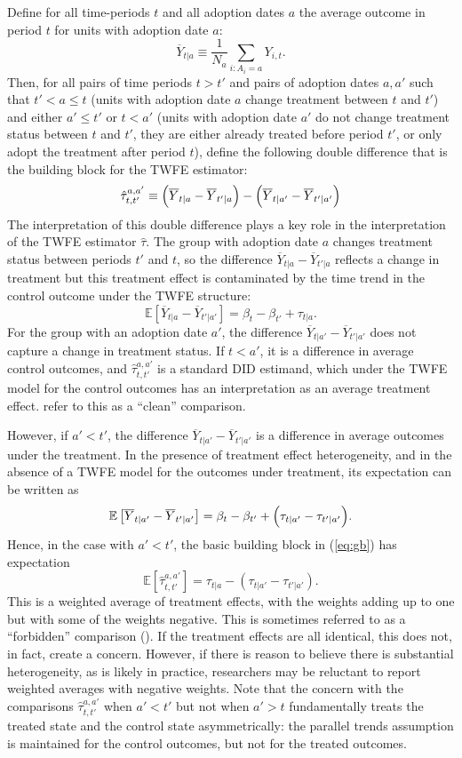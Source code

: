 \documentclass[letterpaper,12pt,leqno]{article}
\newcommand{\oy}{\overline{Y}}
\newcommand{\mme}{{\mathbb{E}}}
\begin{document}
Define for all time-periods $t$ and all adoption dates $a$ the average outcome in period $t$ for units with adoption date $a$:
\[ \oy_{t|a}\equiv \frac{1}{N_a}\sum_{i:A_i=a} Y_{i,t}.\]
Then, for all pairs of time periods $t>t'$ and pairs of adoption dates $a,a'$ such that $t'<a\leq t$ (units with adoption date $a$ change treatment between $t$ and $t'$) and either $a'\leq t'$ or $t<a'$ (units with adoption date $a'$ do not change treatment status between $t$ and $t'$, they are either already treated before period $t'$, or only adopt the treatment after period $t$), define the following double difference that is the building block for the  TWFE estimator:
\begin{equation}\label{eq:gb} \hat\tau_{t,t'}^{a,a'}\equiv \Bigl(\overline{Y}_{t|a}-\overline{Y}_{t^{\prime}|a}\Bigr)
-\Bigl(\overline{Y}_{t|a'}-\overline{Y}_{t'|a'}\Bigr)\end{equation}
The interpretation of this double difference plays a key role in the interpretation of the TWFE estimator $\hat\tau$. The group with adoption date $a$ changes treatment status between periods $t'$ and $t$, so the difference 
$\overline{Y}_{t|a}-\overline{Y}_{t'|a}$ reflects a change in treatment but this treatment effect is contaminated by the time trend in the control outcome under the TWFE structure:
\[\mme\left[\overline{Y}_{t|a}-\overline{Y}_{t'|a'}\right]=\beta_{t}-\beta_{t'}+\tau_{t|a}.\]For the group with an adoption date $a'$, the difference
$\overline{Y}_{t|a'}-\overline{Y}_{t'|a'}$ does not capture a change in treatment status. If $t<a'$, it is a difference in average control outcomes, and $\hat\tau_{t,t'}^{a,a'}$ is a standard DID estimand, which under the TWFE model for the control outcomes has an interpretation as an average treatment effect. 
\citep*{roth2023s} refer to this as a ``clean'' comparison.

However, if $a'<t'$,  the difference
$\overline{Y}_{t|a'}-\overline{Y}_{t'|a'}$ is a difference in average outcomes under the treatment. In the presence of treatment effect heterogeneity, and in the absence of a TWFE model for the outcomes under treatment, its expectation can be written as
\[\mme\left[\overline{Y}_{t|a'}-\overline{Y}_{t'|a'}\right]=\beta_{t}-\beta_{t'}+\Bigl(\tau_{t|a'}-\tau_{t'|a'}\Bigr).\]
Hence, in the case with $a'<t'$, the basic building block in (\ref{eq:gb}) has expectation
\[\mme\left[\hat\tau_{t,t'}^{a,a'}\right]=\tau_{t|a}-\left(\tau_{t|a'}-\tau_{t'|a'}\right).\]
This is a weighted average of treatment effects, with the weights adding up to one but with some of the weights negative. This is sometimes referred to as a ``forbidden'' comparison (\cite{roth2023s}).
If the treatment effects are all identical, this does not, in fact, create a concern. However,  if there is reason to believe there is substantial heterogeneity, as is likely in practice, researchers may be reluctant to report weighted averages with negative weights.
Note that the concern with the comparisons $\hat\tau_{t,t'}^{a,a'}$ when $a'<t'$ but not when $a'>t$ fundamentally treats the treated state and the control state asymmetrically: the parallel trends assumption is maintained for the control outcomes, but not for the treated outcomes.
\end{document}
